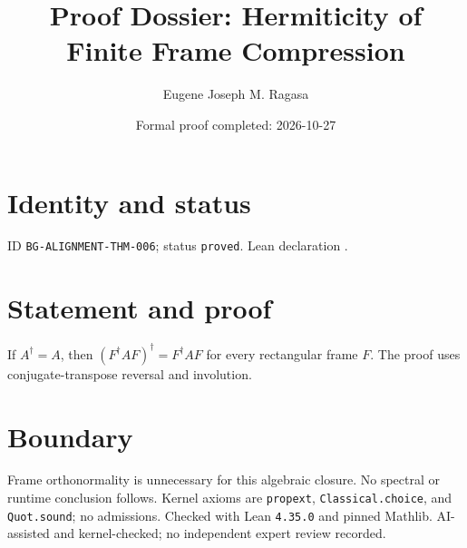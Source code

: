 \documentclass[11pt]{article}
\title{Proof Dossier: Hermiticity of Finite Frame Compression}\author{Eugene Joseph M. Ragasa}\date{Formal proof completed: 2026-10-27}
\begin{document}
\maketitle
\section{Identity and status}
ID \texttt{BG-ALIGNMENT-THM-006}; status \texttt{proved}. Lean declaration .
\section{Statement and proof}
If $A^\dagger=A$, then $(F^\dagger A F)^\dagger=F^\dagger A F$ for every rectangular frame $F$. The proof uses conjugate-transpose reversal and involution.
\section{Boundary}
Frame orthonormality is unnecessary for this algebraic closure. No spectral or runtime conclusion follows. Kernel axioms are \texttt{propext}, \texttt{Classical.choice}, and \texttt{Quot.sound}; no admissions. Checked with Lean \texttt{4.35.0} and pinned Mathlib. AI-assisted and kernel-checked; no independent expert review recorded.
\end{document}
